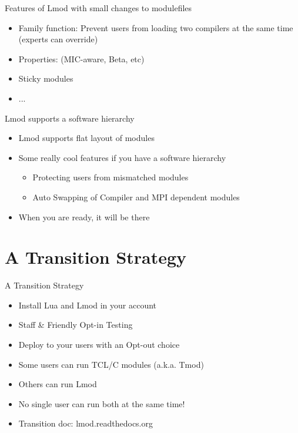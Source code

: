 \documentclass{beamer}
\begin{document}
\begin{frame}{Features of Lmod with small changes to modulefiles}
  \begin{itemize}
    \item Family function: Prevent users from loading two compilers at
      the same time (experts can override)
    \item Properties: (MIC-aware, Beta, etc)
    \item Sticky modules
    \item ...
  \end{itemize}
\end{frame}

\begin{frame}{Lmod supports a software hierarchy}
  \begin{itemize}
    \item Lmod supports flat layout of modules
    \item Some really cool features if you have a software hierarchy
      \begin{itemize}
        \item Protecting users from mismatched modules
        \item Auto Swapping of Compiler and MPI dependent modules
      \end{itemize}
    \item When you are ready, it will be there
  \end{itemize}
\end{frame}

\section{A Transition Strategy}

\begin{frame}{A Transition Strategy}
  \begin{itemize}
    \item Install Lua and Lmod in your account
    \item Staff \& Friendly Opt-in Testing
    \item Deploy to your users with an Opt-out choice
    \item Some users can run TCL/C modules (a.k.a. Tmod)
    \item Others can run Lmod
    \item No single user can run both at the same time!
    \item Transition doc: lmod.readthedocs.org
  \end{itemize}
\end{frame}
\end{document}
